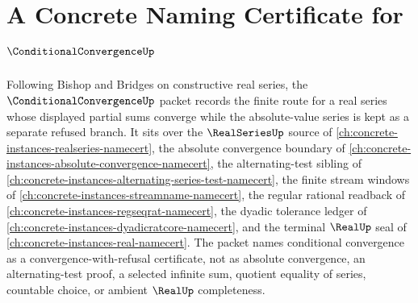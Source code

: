\chapter{A Concrete Naming Certificate for $\ConditionalConvergenceUp$}
\label{ch:concrete-instances-conditional-convergence-namecert}

Following Bishop and Bridges on constructive real series, the $\ConditionalConvergenceUp$ packet records the finite route for a real series whose displayed partial sums converge while the absolute-value series is kept as a separate refused branch. It sits over the $\RealSeriesUp$ source of \autoref{ch:concrete-instances-realseries-namecert}, the absolute convergence boundary of \autoref{ch:concrete-instances-absolute-convergence-namecert}, the alternating-test sibling of \autoref{ch:concrete-instances-alternating-series-test-namecert}, the finite stream windows of \autoref{ch:concrete-instances-streamname-namecert}, the regular rational readback of \autoref{ch:concrete-instances-regseqrat-namecert}, the dyadic tolerance ledger of \autoref{ch:concrete-instances-dyadicratcore-namecert}, and the terminal $\RealUp$ seal of \autoref{ch:concrete-instances-real-namecert}. The packet names conditional convergence as a convergence-with-refusal certificate, not as absolute convergence, an alternating-test proof, a selected infinite sum, quotient equality of series, countable choice, or ambient $\RealUp$ completeness.

